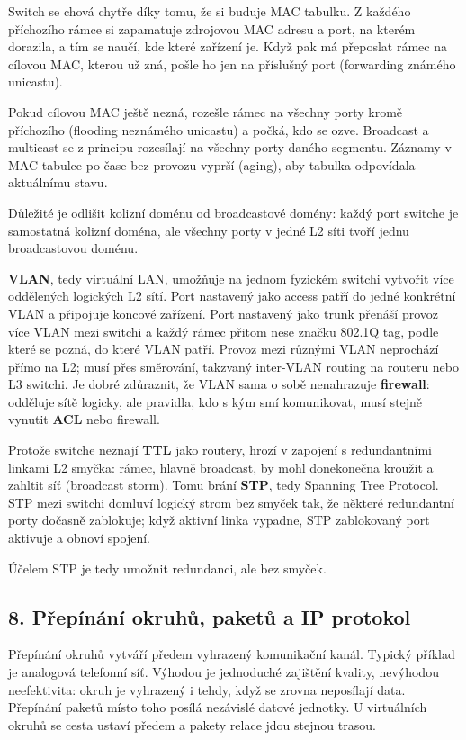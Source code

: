 Switch se chová chytře díky tomu, že si buduje MAC tabulku. Z každého příchozího rámce si zapamatuje zdrojovou MAC adresu a port, na kterém dorazila, a tím se naučí, kde které zařízení je. Když pak má přeposlat rámec na cílovou MAC, kterou už zná, pošle ho jen na příslušný port (forwarding známého unicastu).

Pokud cílovou MAC ještě nezná, rozešle rámec na všechny porty kromě příchozího (flooding neznámého unicastu) a počká, kdo se ozve. Broadcast a multicast se z principu rozesílají na všechny porty daného segmentu. Záznamy v MAC tabulce po čase bez provozu vyprší (aging), aby tabulka odpovídala aktuálnímu stavu.

Důležité je odlišit kolizní doménu od broadcastové domény: každý port switche je samostatná kolizní doména, ale všechny porty v jedné L2 síti tvoří jednu broadcastovou doménu.

\textbf{VLAN}, tedy virtuální LAN, umožňuje na jednom fyzickém switchi vytvořit více oddělených logických L2 sítí. Port nastavený jako access patří do jedné konkrétní VLAN a připojuje koncové zařízení. Port nastavený jako trunk přenáší provoz více VLAN mezi switchi a každý rámec přitom nese značku 802.1Q tag, podle které se pozná, do které VLAN patří. Provoz mezi různými VLAN neprochází přímo na L2; musí přes směrování, takzvaný inter-VLAN routing na routeru nebo L3 switchi. Je dobré zdůraznit, že VLAN sama o sobě nenahrazuje \textbf{firewall}: odděluje sítě logicky, ale pravidla, kdo s kým smí komunikovat, musí stejně vynutit \textbf{ACL} nebo firewall.

Protože switche neznají \textbf{TTL} jako routery, hrozí v zapojení s redundantními linkami L2 smyčka: rámec, hlavně broadcast, by mohl donekonečna kroužit a zahltit síť (broadcast storm). Tomu brání \textbf{STP}, tedy Spanning Tree Protocol. STP mezi switchi domluví logický strom bez smyček tak, že některé redundantní porty dočasně zablokuje; když aktivní linka vypadne, STP zablokovaný port aktivuje a obnoví spojení.

Účelem STP je tedy umožnit redundanci, ale bez smyček.

\subsection*{8. Přepínání okruhů, paketů a IP protokol}

Přepínání okruhů vytváří předem vyhrazený komunikační kanál. Typický příklad je analogová telefonní síť. Výhodou je jednoduché zajištění kvality, nevýhodou neefektivita: okruh je vyhrazený i tehdy, když se zrovna neposílají data. Přepínání paketů místo toho posílá nezávislé datové jednotky. U virtuálních okruhů se cesta ustaví předem a pakety relace jdou stejnou trasou.

